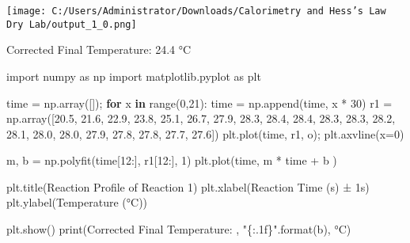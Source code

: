 \documentclass[
]{article}
\newenvironment{Shaded}{}{}
\newcommand{\BuiltInTok}[1]{#1}
\newcommand{\ControlFlowTok}[1]{\textcolor[rgb]{0.00,0.44,0.13}{\textbf{#1}}}
\newcommand{\DecValTok}[1]{\textcolor[rgb]{0.25,0.63,0.44}{#1}}
\newcommand{\FloatTok}[1]{\textcolor[rgb]{0.25,0.63,0.44}{#1}}
\newcommand{\ImportTok}[1]{#1}
\newcommand{\KeywordTok}[1]{\textcolor[rgb]{0.00,0.44,0.13}{\textbf{#1}}}
\newcommand{\NormalTok}[1]{#1}
\newcommand{\OperatorTok}[1]{\textcolor[rgb]{0.40,0.40,0.40}{#1}}
\newcommand{\SpecialCharTok}[1]{\textcolor[rgb]{0.25,0.44,0.63}{#1}}
\newcommand{\StringTok}[1]{\textcolor[rgb]{0.25,0.44,0.63}{#1}}
\begin{document}
\texttt{[image: C:/Users/Administrator/Downloads/Calorimetry and Hess's Law Dry Lab/output\_1\_0.png]}

\begin{Shaded}
\begin{Highlighting}[]
\NormalTok{Corrected Final Temperature:  24.4 °C}
\end{Highlighting}
\end{Shaded}

\begin{Shaded}
\begin{Highlighting}[]
\ImportTok{import}\NormalTok{ numpy }\ImportTok{as}\NormalTok{ np}
\ImportTok{import}\NormalTok{ matplotlib.pyplot }\ImportTok{as}\NormalTok{ plt}

\NormalTok{time }\OperatorTok{=}\NormalTok{ np.array([])}\OperatorTok{;}
\ControlFlowTok{for}\NormalTok{ x }\KeywordTok{in} \BuiltInTok{range}\NormalTok{(}\DecValTok{0}\NormalTok{,}\DecValTok{21}\NormalTok{):}
\NormalTok{    time }\OperatorTok{=}\NormalTok{ np.append(time, x }\OperatorTok{*} \DecValTok{30}\NormalTok{)}
\NormalTok{r1 }\OperatorTok{=}\NormalTok{ np.array([}\FloatTok{20.5}\NormalTok{, }\FloatTok{21.6}\NormalTok{, }\FloatTok{22.9}\NormalTok{, }\FloatTok{23.8}\NormalTok{, }\FloatTok{25.1}\NormalTok{, }\FloatTok{26.7}\NormalTok{, }\FloatTok{27.9}\NormalTok{, }\FloatTok{28.3}\NormalTok{, }\FloatTok{28.4}\NormalTok{, }\FloatTok{28.4}\NormalTok{, }\FloatTok{28.3}\NormalTok{, }\FloatTok{28.3}\NormalTok{, }\FloatTok{28.2}\NormalTok{, }\FloatTok{28.1}\NormalTok{, }\FloatTok{28.0}\NormalTok{, }\FloatTok{28.0}\NormalTok{, }\FloatTok{27.9}\NormalTok{, }\FloatTok{27.8}\NormalTok{, }\FloatTok{27.8}\NormalTok{, }\FloatTok{27.7}\NormalTok{, }\FloatTok{27.6}\NormalTok{])}
\NormalTok{plt.plot(time, r1, }\StringTok{\textquotesingle{}o\textquotesingle{}}\NormalTok{)}\OperatorTok{;}
\NormalTok{plt.axvline(x}\OperatorTok{=}\DecValTok{0}\NormalTok{)}

\NormalTok{m, b }\OperatorTok{=}\NormalTok{ np.polyfit(time[}\DecValTok{12}\NormalTok{:], r1[}\DecValTok{12}\NormalTok{:], }\DecValTok{1}\NormalTok{)}
\NormalTok{plt.plot(time, m }\OperatorTok{*}\NormalTok{ time }\OperatorTok{+}\NormalTok{ b )}


\NormalTok{plt.title(}\StringTok{\textquotesingle{}Reaction Profile of Reaction 1\textquotesingle{}}\NormalTok{)}
\NormalTok{plt.xlabel(}\StringTok{\textquotesingle{}Reaction Time (s) ± 1s\textquotesingle{}}\NormalTok{)}
\NormalTok{plt.ylabel(}\StringTok{\textquotesingle{}Temperature (°C)\textquotesingle{}}\NormalTok{)}

\NormalTok{plt.show()}
\BuiltInTok{print}\NormalTok{(}\StringTok{\textquotesingle{}Corrected Final Temperature: \textquotesingle{}}\NormalTok{, }\StringTok{"}\SpecialCharTok{\{:.1f\}}\StringTok{"}\NormalTok{.}\BuiltInTok{format}\NormalTok{(b), }\StringTok{\textquotesingle{}°C\textquotesingle{}}\NormalTok{) }
\end{Highlighting}
\end{Shaded}
\end{document}
